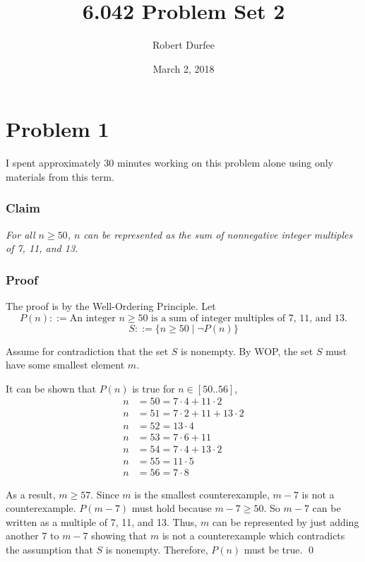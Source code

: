 \documentclass{article}
\title{ 6.042 Problem Set 2 }
\author{ Robert Durfee }
\date{ March 2, 2018 }
\begin{document}
\maketitle

\section*{Problem 1 }

I spent approximately 30 minutes working on this problem alone using only
materials from this term.

\subsubsection*{Claim}

\textit{For all $n \geq 50$, $n$ can be represented as the sum of nonnegative
integer multiples of 7, 11, and 13.}

\subsubsection*{Proof}

The proof is by the Well-Ordering Principle. Let
$$ P(n) ::= \textrm{An integer } n \geq 50 \textrm{ is a sum of integer multiples of
7, 11, and 13.} $$
$$ S ::= \{n \geq 50 \mid \lnot P(n) \} $$

Assume for contradiction that the set $S$ is nonempty. By WOP, the set $S$
must have some smallest element $m$.

\bigbreak

It can be shown that $P(n)$ is true for $n \in [50..56]$,
\begin{align*}
  n &= 50 = 7 \cdot 4 + 11 \cdot 2  \\
  n &= 51 = 7 \cdot 2 + 11 + 13 \cdot 2  \\
  n &= 52 = 13 \cdot 4  \\
  n &= 53 = 7 \cdot 6 + 11  \\
  n &= 54 = 7 \cdot 4 + 13 \cdot 2 \\
  n &= 55 = 11 \cdot 5 \\
  n &= 56 = 7 \cdot 8
\end{align*}

\bigbreak

As a result, $m \geq 57$. Since $m$ is the smallest counterexample, $m - 7$ is
not a counterexample. $P(m - 7)$ must hold because $m - 7 \geq 50$. So $m - 7$
can be written as a multiple of 7, 11, and 13. Thus, $m$ can be represented by
just adding another 7 to $m - 7$ showing that $m$ is not a counterexample which
contradicts the assumption that $S$ is nonempty. Therefore, $P(n)$ must be true.
\qed
\end{document}
